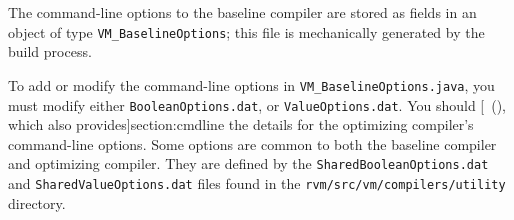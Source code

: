 The command-line options to the baseline compiler are
stored as fields in an object of type {\tt VM\_BaselineOptions}; this
file is mechanically generated by the build process. 

To add or modify the command-line options in {\tt VM\_BaselineOptions.java},
you must modify either {\tt BooleanOptions.dat}, or {\tt ValueOptions.dat}.
You should [~(\Ref), which also
  provides]{section:cmdline} the
details for the optimizing compiler's command-line options.
Some options are common to both the baseline compiler and optimizing
compiler. They are defined by the {\tt SharedBooleanOptions.dat} and
{\tt SharedValueOptions.dat} files found in the
{\tt rvm/src/vm/compilers/utility} directory. 

